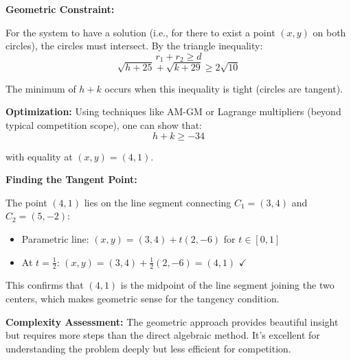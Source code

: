 \documentclass[12pt]{article}
\begin{document}
\begin{solutionbox}
\textbf{Geometric Constraint:}

For the system to have a solution (i.e., for there to exist a point $(x, y)$ on both circles), the circles must intersect. By the triangle inequality:
\[r_1 + r_2 \geq d\]
\[\sqrt{h + 25} + \sqrt{k + 29} \geq 2\sqrt{10}\]

The minimum of $h + k$ occurs when this inequality is tight (circles are tangent).

\textbf{Optimization:} Using techniques like AM-GM or Lagrange multipliers (beyond typical competition scope), one can show that:
\[h + k \geq -34\]

with equality at $(x, y) = (4, 1)$.

\textbf{Finding the Tangent Point:}

The point $(4, 1)$ lies on the line segment connecting $C_1 = (3, 4)$ and $C_2 = (5, -2)$:
\begin{itemize}
    \item Parametric line: $(x, y) = (3, 4) + t(2, -6)$ for $t \in [0, 1]$
    \item At $t = \frac{1}{2}$: $(x, y) = (3, 4) + \frac{1}{2}(2, -6) = (4, 1)$ $\checkmark$
\end{itemize}

This confirms that $(4, 1)$ is the midpoint of the line segment joining the two centers, which makes geometric sense for the tangency condition.

\textbf{Complexity Assessment:} The geometric approach provides beautiful insight but requires more steps than the direct algebraic method. It's excellent for understanding the problem deeply but less efficient for competition.
\end{solutionbox}

\vspace{1em}
\end{document}
